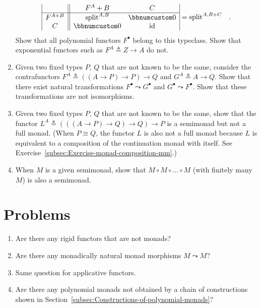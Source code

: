 \begin{enumerate}
\[\begin{array}{|c||cc|}
 & F^{A}+B & C\\
\hline F^{A+B} & \text{split}^{A,B} & \bbnum 0\\
C & \bbnum 0 & \text{id}
\end{array}=\text{split}^{A,B+C}\quad.
\]
Show that all polynomial functors $F^{\bullet}$ belong to this typeclass.
Show that exponential functors such as $F^{A}\triangleq Z\rightarrow A$
do not. 
\item Given two fixed types $P$, $Q$ that are not known to be the same,
consider the contrafunctors $F^{A}\triangleq\left(\left(A\rightarrow P\right)\rightarrow P\right)\rightarrow Q$
and $G^{A}\triangleq A\rightarrow Q$. Show that there exist natural
transformations $F^{\bullet}\leadsto G^{\bullet}$ and $G^{\bullet}\leadsto F^{\bullet}$.
Show that these transformations are not isomorphisms.
\item Given two fixed types $P$, $Q$ that are not known to be the same,
show that the functor $L^{A}\triangleq\left(\left(\left(A\rightarrow P\right)\rightarrow Q\right)\rightarrow Q\right)\rightarrow P$
is a semimonad but not a full monad. (When $P\cong Q$, the functor
$L$ is also not a full monad because $L$ is equivalent to a composition
of the continuation monad with itself. See Exercise~\ref{subsec:Exercise-monad-composition-mm}.)
\item When $M$ is a given semimonad, show that $M\circ M\circ...\circ M$
(with finitely many $M$) is also a semimonad.
\end{enumerate}

\section{Problems}
\begin{enumerate}
\item Are there any rigid functors that are not monads?
\item Are there any monadically natural monad morphisms $M\leadsto M$?
\item Same question for applicative functors.
\item Are there any polynomial monads not obtained by a chain of constructions
shown in Section~\ref{subsec:Constructions-of-polynomial-monads}?
\end{enumerate}

